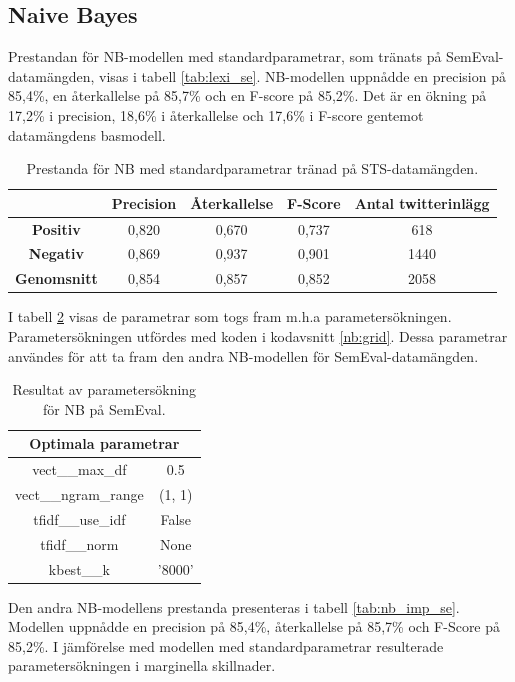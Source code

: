 \documentclass{kaumasters} %
\begin{document}
\subsection{Naive Bayes}
Prestandan för NB-modellen med standardparametrar, som tränats på SemEval-datamängden, visas i tabell \ref{tab:lexi_se}. NB-modellen uppnådde en precision på 85,4\%, en återkallelse på 85,7\% och en F-score på 85,2\%. Det är en ökning på 17,2\% i precision, 18,6\% i återkallelse och 17,6\% i F-score gentemot datamängdens basmodell.

\begin{table}[H]
\centering
\caption{Prestanda för NB med standardparametrar tränad på STS-datamängden.}
\label{tab:nb_base_se}
    \begin{tabular}{ccccc}
    \toprule
     & \textbf{Precision} & \textbf{Återkallelse} & \textbf{F-Score} & \textbf{Antal twitterinlägg}  \\
    \midrule
    \textbf{Positiv} & 0,820 & 0,670 & 0,737 & 618 \\
    \textbf{Negativ} & 0,869 & 0,937 & 0,901 & 1440 \\
    \midrule
    \textbf{Genomsnitt} & 0,854 & 0,857 & 0,852  & 2058 \\
    \bottomrule
\end{tabular}
\end{table}

I tabell \ref{tab:nb_grid_se} visas de parametrar som togs fram m.h.a parametersökningen. Parametersökningen utfördes med koden i kodavsnitt \ref{nb:grid}. Dessa parametrar användes för att ta fram den andra NB-modellen för SemEval-datamängden.

\begin{table}[H]
\centering
\caption{Resultat av parametersökning för NB på SemEval.}
\label{tab:nb_grid_se}
    \begin{tabular}{cc}
    \toprule
    \multicolumn{2}{c}{\textbf{Optimala parametrar}} \\
    \midrule
    vect\_\_max\_df & 0.5  \\
    vect\_\_ngram\_range & (1, 1)  \\
    tfidf\_\_use\_idf & False  \\
    tfidf\_\_norm & None  \\
    kbest\_\_k & '8000' \\
    \bottomrule
\end{tabular}
\end{table}

Den andra NB-modellens prestanda presenteras i tabell \ref{tab:nb_imp_se}. Modellen uppnådde en precision på 85,4\%, återkallelse på 85,7\% och F-Score på 85,2\%. I jämförelse med modellen med standardparametrar resulterade parametersökningen i marginella skillnader.  
\end{document}
